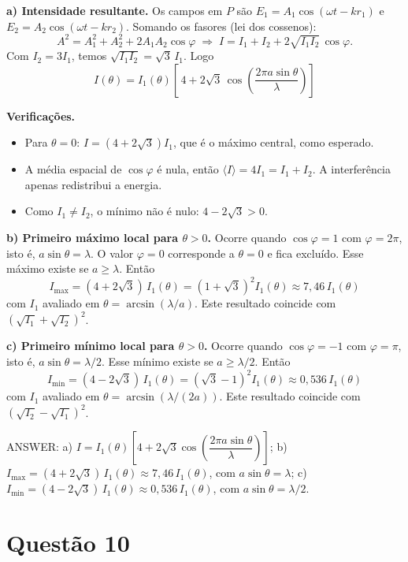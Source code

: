 \documentclass{article}%
\begin{document}
\textbf{a) Intensidade resultante.} Os campos em $P$ são $E_1 = A_1\cos(\omega t - kr_1)$ e $E_2=A_2\cos(\omega t - kr_2)$. Somando os fasores (lei dos cossenos):
\[
A^2 = A_1^2 + A_2^2 + 2A_1A_2\cos\varphi
\;\Longrightarrow\;
I = I_1 + I_2 + 2\sqrt{I_1I_2}\,\cos\varphi .
\]
Com $I_2=3I_1$, temos $\sqrt{I_1I_2}=\sqrt{3}\,I_1$. Logo
\[
\boxed{\,I(\theta) = I_1(\theta)\left[\,4 + 2\sqrt{3}\,\cos\!\left(\frac{2\pi a\sin\theta}{\lambda}\right)\right]\,}
\]

\textbf{Verificações.}
\begin{itemize}
\item Para $\theta = 0$: $I=(4+2\sqrt3)I_1$, que é o máximo central, como esperado.
\item A média espacial de $\cos\varphi$ é nula, então $\langle I\rangle = 4I_1 = I_1 + I_2$. A interferência apenas redistribui a energia.
\item Como $I_1\neq I_2$, o mínimo não é nulo: $4-2\sqrt3>0$.
\end{itemize}

\textbf{b) Primeiro máximo local para $\theta>0$.} Ocorre quando $\cos\varphi = 1$ com $\varphi = 2\pi$, isto é, $a\sin\theta = \lambda$. O valor $\varphi=0$ corresponde a $\theta=0$ e fica excluído. Esse máximo existe se $a\ge\lambda$. Então
\[
\boxed{\,I_{\max} = (4+2\sqrt3)\,I_1(\theta) = \left(1+\sqrt3\right)^2 I_1(\theta) \approx 7{,}46\,I_1(\theta)\,}
\]
com $I_1$ avaliado em $\theta = \arcsin(\lambda/a)$. Este resultado coincide com $\left(\sqrt{I_1}+\sqrt{I_2}\right)^2$.

\textbf{c) Primeiro mínimo local para $\theta>0$.} Ocorre quando $\cos\varphi=-1$ com $\varphi=\pi$, isto é, $a\sin\theta = \lambda/2$. Esse mínimo existe se $a\ge\lambda/2$. Então
\[
\boxed{\,I_{\min} = (4-2\sqrt3)\,I_1(\theta) = \left(\sqrt3-1\right)^2 I_1(\theta) \approx 0{,}536\,I_1(\theta)\,}
\]
com $I_1$ avaliado em $\theta=\arcsin\!\left(\lambda/(2a)\right)$. Este resultado coincide com $\left(\sqrt{I_2}-\sqrt{I_1}\right)^2$.

ANSWER: a) $I = I_1(\theta)\left[4+2\sqrt3\cos\left(\dfrac{2\pi a\sin\theta}{\lambda}\right)\right]$; b) $I_{\max}=(4+2\sqrt3)\,I_1(\theta)\approx 7{,}46\,I_1(\theta)$, com $a\sin\theta=\lambda$; c) $I_{\min}=(4-2\sqrt3)\,I_1(\theta)\approx 0{,}536\,I_1(\theta)$, com $a\sin\theta=\lambda/2$.%
\newpage%
\section*{Questão 10}
\end{document}
